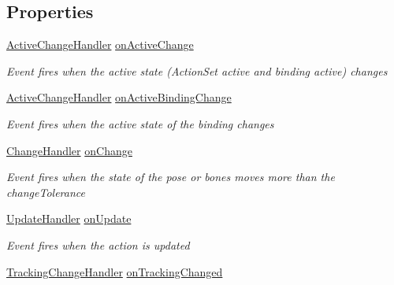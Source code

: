 \subsection*{Properties}
\begin{DoxyCompactItemize}
\item 
\mbox{\hyperlink{class_valve_1_1_v_r_1_1_steam_v_r___action___skeleton_ae329ff2582f41c7ec52ecdf3b34b345a}{Active\+Change\+Handler}} \mbox{\hyperlink{class_valve_1_1_v_r_1_1_steam_v_r___action___skeleton_ad0281a649602158d0c570073542301c6}{on\+Active\+Change}}
\begin{DoxyCompactList}\small\item\em Event fires when the active state (Action\+Set active and binding active) changes \end{DoxyCompactList}\item 
\mbox{\hyperlink{class_valve_1_1_v_r_1_1_steam_v_r___action___skeleton_ae329ff2582f41c7ec52ecdf3b34b345a}{Active\+Change\+Handler}} \mbox{\hyperlink{class_valve_1_1_v_r_1_1_steam_v_r___action___skeleton_a9dfdb7b338667f73fa18cb69cf386574}{on\+Active\+Binding\+Change}}
\begin{DoxyCompactList}\small\item\em Event fires when the active state of the binding changes \end{DoxyCompactList}\item 
\mbox{\hyperlink{class_valve_1_1_v_r_1_1_steam_v_r___action___skeleton_a41a68545cb313ef9f47600d9e9022177}{Change\+Handler}} \mbox{\hyperlink{class_valve_1_1_v_r_1_1_steam_v_r___action___skeleton_ac8453162e7dbb072e4b3677d82239947}{on\+Change}}
\begin{DoxyCompactList}\small\item\em Event fires when the state of the pose or bones moves more than the change\+Tolerance \end{DoxyCompactList}\item 
\mbox{\hyperlink{class_valve_1_1_v_r_1_1_steam_v_r___action___skeleton_a9fd666c2f3ccefc435275d85c525337c}{Update\+Handler}} \mbox{\hyperlink{class_valve_1_1_v_r_1_1_steam_v_r___action___skeleton_a3c9274e83076910a3b6a797cd53052b3}{on\+Update}}
\begin{DoxyCompactList}\small\item\em Event fires when the action is updated \end{DoxyCompactList}\item 
\mbox{\hyperlink{class_valve_1_1_v_r_1_1_steam_v_r___action___skeleton_a460bcda41aa359ec14435212bed2b856}{Tracking\+Change\+Handler}} \mbox{\hyperlink{class_valve_1_1_v_r_1_1_steam_v_r___action___skeleton_ab2bc1933b34032d38d02e78f641c5e78}{on\+Tracking\+Changed}}

\end{DoxyCompactItemize}
